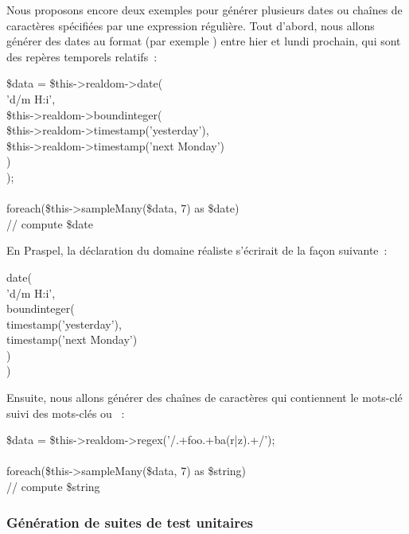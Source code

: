 \begin{example}

Nous proposons encore deux exemples pour générer plusieurs dates ou chaînes de
caractères spécifiées par une expression régulière. Tout d'abord, nous allons
générer des dates au format  (par exemple )
entre hier et lundi prochain, qui sont des repères temporels relatifs~:

%
\begin{pre}
\$data = \$this->realdom->date( \\
    'd/m H:i', \\
    \$this->realdom->boundinteger( \\
        \$this->realdom->timestamp('yesterday'), \\
        \$this->realdom->timestamp('next Monday') \\
    ) \\
); \\
 \\
foreach(\$this->sampleMany(\$data, 7) as \$date) \\
    // compute \$date
\end{pre}
%
En Praspel, la déclaration du domaine réaliste s'écrirait de la façon suivante~:
%
\begin{pre}
date( \\
    'd/m H:i', \\
    boundinteger( \\
        timestamp('yesterday'), \\
        timestamp('next Monday') \\
    ) \\
)
\end{pre}
%
Ensuite, nous allons générer des chaînes de caractères qui contiennent
le mots-clé  suivi des mots-clés  ou ~:
%
\begin{pre}
\$data = \$this->realdom->regex('/.+foo.+ba(r|z).+/'); \\
 \\
foreach(\$this->sampleMany(\$data, 7) as \$string) \\
    // compute \$string
\end{pre}

\end{example}

\subsubsection{Génération de suites de test unitaires}

